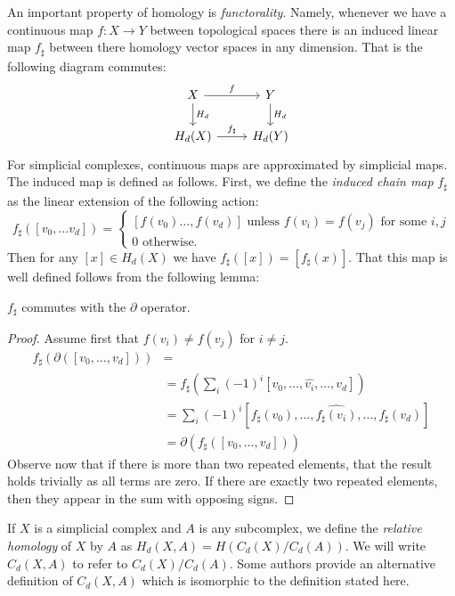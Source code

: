 An important property of homology is \emph{functorality}. Namely, whenever we have a continuous map $f: X \rightarrow Y$ between topological spaces there is an induced linear map $f_\sharp$ between there homology vector spaces in any dimension. That is the following diagram commutes:
\[ \begin{tikzcd}
X \arrow{r}{f}\arrow{d}{H_d} & Y \arrow{d}{H_d} \\
H_d(X) \arrow{r}{f_{\sharp}} & H_d(Y)
\end{tikzcd} \]
For simplicial complexes, continuous maps are approximated by simplicial maps. The induced map is defined as follows. First, we define the \emph{induced chain map} $f_\sharp$ as the linear extension of the following action: 
\[ f_\sharp([v_0, \ldots v_d]) = 
\begin{cases} 
    [f(v_0) \ldots, f(v_d)] \textrm{ unless } f(v_i) = f(v_j) \textrm{ for some } i,j \\
    0 \textrm{ otherwise. }
   \end{cases}
\]
Then for any $[x] \in H_d(X)$ we have $f_\sharp([x]) = [f_{\sharp}(x)]$.  That this map is well defined follows from 
the following lemma:
\begin{lemma}
$f_\sharp$ commutes with the $\partial$ operator. 
\end{lemma}
\begin{proof}
Assume first that $f(v_i) \neq f(v_j)$ for $i \neq j$.
\begin{align*}
f_\sharp(\partial([v_0, \ldots, v_d])) &= \\
&= f_{\sharp}(\sum_i (-1)^i[v_0, \ldots, \hat{v_i}, \ldots, v_d])  \\
&=  \sum_i(-1)^i [f_{\sharp}(v_0), \ldots, \hat{f_{\sharp}(v_i)}, \ldots, f_{\sharp}(v_d)] \\
&=  \partial(f_\sharp([v_0, \ldots, v_d]))
\end{align*}
Observe now that if there is more than two repeated elements, that the result holds trivially as all terms are zero. If there are exactly two repeated elements, then they appear
in the sum with opposing signs.
\end{proof}

If $X$ is a simplicial complex and $A$ is any subcomplex, we define the \emph{relative homology} of $X$ by $A$ as $H_d(X,A) = H(C_d(X)/C_d(A))$. We will write $C_d(X,A)$ to refer to $C_d(X)/C_d(A)$.  Some authors provide an alternative definition of $C_d(X,A)$ which is isomorphic to the definition stated here.

